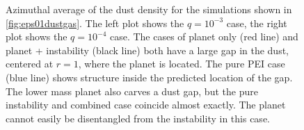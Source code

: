 \documentclass[onecolumn]{report}
\begin{document}
\begin{figure}
  \begin{center}
  \end{center}
  \caption{Azimuthal average of the dust density for the simulations shown in
    \ref{fig:eps01dustgas}. The left plot shows the $q=10^{-3}$ case, the
    right plot shows the $q=10^{-4}$ case. The cases of planet only
    (red line) and planet + instability (black line) both have a large gap in the dust, centered at $r=1$, where the
    planet is located. The pure PEI case (blue line) shows structure inside the
    predicted location of the gap. The lower mass planet also carves a
    dust gap, but the pure instability and combined case coincide
    almost exactly. The planet cannot easily be disentangled
    from the instability in this case.}
  \label{fig:eps01dustprofile}
\end{figure}   
\end{document}
